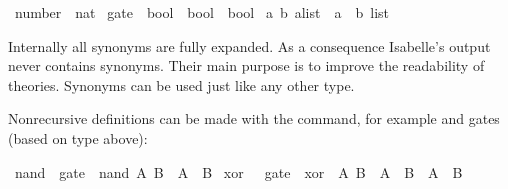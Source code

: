 %
\begin{isabellebody}%
\def\isabellecontext{types}%
%
\isadelimtheory
%
\endisadelimtheory
%
\isatagtheory
%
\endisatagtheory
{\isafoldtheory}%
%
\isadelimtheory
%
\endisadelimtheory
{}\isamarkupfalse%
\ number\ {}\ nat\isanewline
{}\isamarkupfalse%
\ gate\ {}\ {}bool\ {}\ bool\ {}\ bool{}\isanewline
{}\isamarkupfalse%
\ {}{}a{}\ {}b{}\ alist\ {}\ {}{}{}a\ {}\ {}b{}\ list{}%
\begin{isamarkuptext}%
\noindent
Internally all synonyms are fully expanded.  As a consequence Isabelle's
output never contains synonyms.  Their main purpose is to improve the
readability of theories.  Synonyms can be used just like any other
type.%
\end{isamarkuptext}%
\isamarkuptrue%
%
\isamarkuptrue%
%
\begin{isamarkuptext}%
\label{sec:ConstDefinitions}%
Nonrecursive definitions can be made with the 
command, for example  and  gates
(based on type  above):%
\end{isamarkuptext}%
\isamarkuptrue%
\isamarkupfalse%
\ nand\ {}{}\ gate\ \ {}nand\ A\ B\ {}\ {}{}A\ {}\ B{}{}\isanewline
{}\isamarkupfalse%
\ xor\ \ {}{}\ gate\ \ {}xor\ \ A\ B\ {}\ A\ {}\ {}B\ {}\ {}A\ {}\ B{}%

\end{isabellebody}
